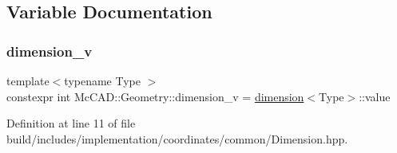 \subsection{Variable Documentation}
\mbox{\label{namespaceMcCAD_1_1Geometry_a609ecc8fedf120159984a785d234a14e}} 
\subsubsection{\texorpdfstring{dimension\+\_\+v}{dimension\_v}}
{\footnotesize\ttfamily template$<$typename Type $>$ \\
constexpr int Mc\+C\+A\+D\+::\+Geometry\+::dimension\+\_\+v = \hyperlink{structMcCAD_1_1Geometry_1_1dimension}{dimension}$<$Type$>$\+::value}



Definition at line 11 of file build/includes/implementation/coordinates/common/\+Dimension.\+hpp.

